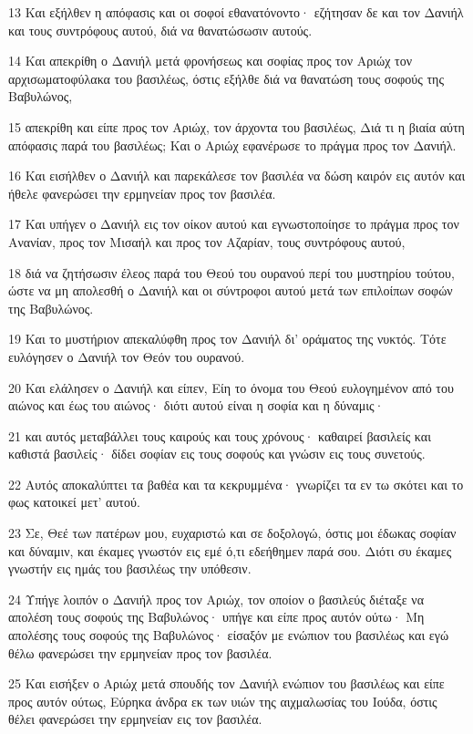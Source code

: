 \par 13 Και εξήλθεν η απόφασις και οι σοφοί εθανατόνοντο· εζήτησαν δε και τον Δανιήλ και τους συντρόφους αυτού, διά να θανατώσωσιν αυτούς.
\par 14 Και απεκρίθη ο Δανιήλ μετά φρονήσεως και σοφίας προς τον Αριώχ τον αρχισωματοφύλακα του βασιλέως, όστις εξήλθε διά να θανατώση τους σοφούς της Βαβυλώνος,
\par 15 απεκρίθη και είπε προς τον Αριώχ, τον άρχοντα του βασιλέως, Διά τι η βιαία αύτη απόφασις παρά του βασιλέως; Και ο Αριώχ εφανέρωσε το πράγμα προς τον Δανιήλ.
\par 16 Και εισήλθεν ο Δανιήλ και παρεκάλεσε τον βασιλέα να δώση καιρόν εις αυτόν και ήθελε φανερώσει την ερμηνείαν προς τον βασιλέα.
\par 17 Και υπήγεν ο Δανιήλ εις τον οίκον αυτού και εγνωστοποίησε το πράγμα προς τον Ανανίαν, προς τον Μισαήλ και προς τον Αζαρίαν, τους συντρόφους αυτού,
\par 18 διά να ζητήσωσιν έλεος παρά του Θεού του ουρανού περί του μυστηρίου τούτου, ώστε να μη απολεσθή ο Δανιήλ και οι σύντροφοι αυτού μετά των επιλοίπων σοφών της Βαβυλώνος.
\par 19 Και το μυστήριον απεκαλύφθη προς τον Δανιήλ δι' οράματος της νυκτός. Τότε ευλόγησεν ο Δανιήλ τον Θεόν του ουρανού.
\par 20 Και ελάλησεν ο Δανιήλ και είπεν, Είη το όνομα του Θεού ευλογημένον από του αιώνος και έως του αιώνος· διότι αυτού είναι η σοφία και η δύναμις·
\par 21 και αυτός μεταβάλλει τους καιρούς και τους χρόνους· καθαιρεί βασιλείς και καθιστά βασιλείς· δίδει σοφίαν εις τους σοφούς και γνώσιν εις τους συνετούς.
\par 22 Αυτός αποκαλύπτει τα βαθέα και τα κεκρυμμένα· γνωρίζει τα εν τω σκότει και το φως κατοικεί μετ' αυτού.
\par 23 Σε, Θεέ των πατέρων μου, ευχαριστώ και σε δοξολογώ, όστις μοι έδωκας σοφίαν και δύναμιν, και έκαμες γνωστόν εις εμέ ό,τι εδεήθημεν παρά σου. Διότι συ έκαμες γνωστήν εις ημάς του βασιλέως την υπόθεσιν.
\par 24 Υπήγε λοιπόν ο Δανιήλ προς τον Αριώχ, τον οποίον ο βασιλεύς διέταξε να απολέση τους σοφούς της Βαβυλώνος· υπήγε και είπε προς αυτόν ούτω· Μη απολέσης τους σοφούς της Βαβυλώνος· είσαξόν με ενώπιον του βασιλέως και εγώ θέλω φανερώσει την ερμηνείαν προς τον βασιλέα.
\par 25 Και εισήξεν ο Αριώχ μετά σπουδής τον Δανιήλ ενώπιον του βασιλέως και είπε προς αυτόν ούτως, Εύρηκα άνδρα εκ των υιών της αιχμαλωσίας του Ιούδα, όστις θέλει φανερώσει την ερμηνείαν εις τον βασιλέα.
